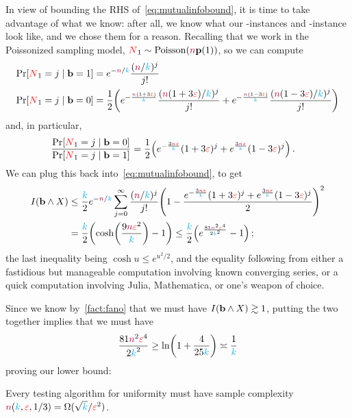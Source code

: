 In view of bounding the RHS of~\cref{eq:mutualinfobound}, it is time to take advantage of what we know: after all, we know what our \no-instances and \yes-instance look like, and we chose them for a reason. Recalling that we work in the Poissonized sampling model, $\occur_{1}\sim\poisson{\ns\p(1)}$, so we can compute
\begin{align*}
\bPr{\occur_1=j\mid \mathbf{b}=\accept }
&= e^{-\ns/\ab} \frac{(\ns/\ab)^j}{j!} \\
\bPr{\occur_1=j\mid \mathbf{b}=\reject }
&= \frac{1}{2}\Paren{ e^{-\frac{\ns(1+3\dst)}{\ab}} \frac{(\ns(1+3\dst)/\ab)^j}{j!}  + e^{-\frac{\ns(1-3\dst)}{\ab}} \frac{(\ns(1-3\dst)/\ab)^j}{j!} }
\end{align*}
and, in particular,
\begin{align}
\frac{\bPr{\occur_1=j\mid \mathbf{b}=\reject }}{\bPr{\occur_1=j\mid \mathbf{b}=\accept }}
&= \frac{1}{2}\Paren{ e^{-\frac{3\ns\dst}{\ab}} (1+3\dst)^j  + e^{\frac{3\ns\dst}{\ab}} (1-3\dst)^j}\,.
\end{align}
We can plug this back into~\cref{eq:mutualinfobound}, to get
\begin{align}
\mutualinfo{\mathbf{b}}{X}  &\leq \frac{\ab}{2} e^{-\ns/\ab}\sum_{j=0}^\infty \frac{(\ns/\ab)^j}{j!}\Paren{ 1- \frac{e^{-\frac{3\ns\dst}{\ab}} (1+3\dst)^j  + e^{\frac{3\ns\dst}{\ab}} (1-3\dst)^j}{2}}^2 \notag\\
&= \frac{\ab}{2}\Paren{\cosh\Paren{ \frac{9\ns\dst^2}{\ab} }-1} \leq \frac{\ab}{2}\Paren{ e^{\frac{81\ns^2\dst^4}{2\ab^2}}-1}\,;
\end{align}
the last inequality being $\cosh u \leq e^{u^2/2}$, and the equality following from either a fastidious but manageable computation involving known converging series, or a quick computation involving Julia, Mathematica, or one's weapon of choice.

Since we know by~\cref{fact:fano} that we must have $\mutualinfo{\mathbf{b}}{X} \gtrsim 1$, putting the two together implies that we must have
\[
	\frac{81\ns^2\dst^4}{2\ab^2} \geq \ln\Paren{1+\frac{4}{25\ab}} \asymp \frac{1}{\ab}
\]
proving our lower bound:
\begin{theorem}
  \label{theo:uniformity:lb:dk16}
Every testing algorithm for uniformity must have sample complexity ${\textcolor{purple}{n}}({\textcolor{cyan}{k}},\textcolor{red}{\varepsilon},1/3) = \Omega(\sqrt{{\textcolor{cyan}{k}}}/\textcolor{red}{\varepsilon}^2)$.
\end{theorem}
